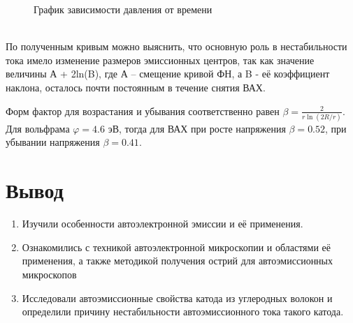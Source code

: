 \documentclass[a4paper, 12pt]{article}
\begin{document}
\begin{enumerate}
\begin{figure}[!htb]
			\caption{График зависимости давления от времени}
		\end{figure}\\
		По полученным кривым можно выяснить, что основную роль в нестабильности тока имело изменение размеров эмиссионных центров, так как значение величины А + 2ln(B), где А – смещение кривой ФН, а B - её коэффициент наклона, осталось почти постоянным в  течение снятия ВАХ.\par
		Форм фактор для возрастания и убывания соответственно равен $\beta=\frac{2}{r\ln(2R/r)}$.
		Для вольфрама $\varphi=4.6$ эВ, тогда для ВАХ при росте напряжения $\beta=0.52$, при убывании напряжения $\beta=0.41$.\par
	\end{enumerate}
	\newpage
	\section{Вывод}
	\begin{enumerate}
		\item Изучили особенности автоэлектронной эмиссии и её применения.
		\item Ознакомились с техникой автоэлектронной микроскопии и областями её применения, а также методикой получения острий для автоэмиссионных микроскопов
		\item Исследовали автоэмиссионные свойства катода из углеродных волокон и определили причину нестабильности автоэмиссионного тока такого катода.
	\end{enumerate}
\end{document}
